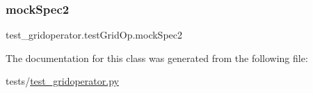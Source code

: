 \subsubsection{\texorpdfstring{mock\+Spec2}{mockSpec2}}
{\footnotesize\ttfamily test\+\_\+gridoperator.\+test\+Grid\+Op.\+mock\+Spec2}



The documentation for this class was generated from the following file\+:\begin{DoxyCompactItemize}
\item 
tests/\hyperlink{test__gridoperator_8py}{test\+\_\+gridoperator.\+py}\end{DoxyCompactItemize}
